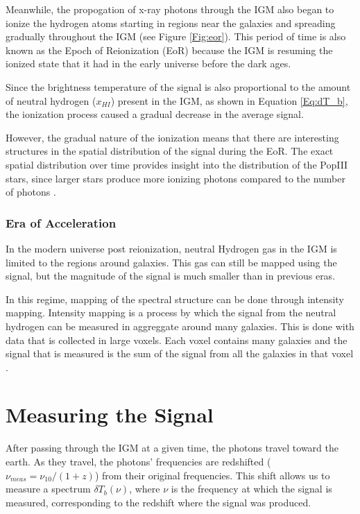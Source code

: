 Meanwhile, the propogation of x-ray photons through the IGM also began to ionize the hydrogen atoms starting in regions near the galaxies and spreading gradually throughout the IGM (see Figure \ref{Fig:eor}). This period of time is also known as the Epoch of Reionization (EoR) because the IGM is resuming the ionized state that it had in the early universe before the dark ages. 

Since the brightness temperature of the \cm signal is also proportional to the amount of neutral hydrogen ($x_{HI}$) present in the IGM, as shown in Equation \ref{Eq:dT_b}, the ionization process caused a gradual decrease in the average \cm signal. 

However, the gradual nature of the ionization means that there are interesting structures in the spatial distribution of the \cm signal during the EoR. The exact spatial distribution over time provides insight into the distribution of the PopIII stars, since larger stars produce more ionizing photons compared to the number of \lya  photons \cite{furlanetto_2006}. 

\subsubsection{Era of Acceleration}
In the modern universe post reionization, neutral Hydrogen gas in the IGM is limited to the regions around galaxies. This gas can still be mapped using the \cm signal, but the magnitude of the signal is much smaller than in previous eras. 

In this regime, mapping of the spectral structure can be done through intensity mapping. Intensity mapping is a process by which the signal from the neutral hydrogen can be measured in aggreggate around many galaxies. This is done with data that is collected in large voxels. Each voxel contains many galaxies and the \cm signal that is measured is the sum of the \cm signal from all the galaxies in that voxel \cite{masui_2012}.

\section{Measuring the \cm Signal}
After passing through the IGM at a given time, the \cm photons travel toward the earth. As they travel, the photons' frequencies are redshifted ($\nu_{meas} = \nu_{10}/(1+z)$) from their original frequencies. This shift allows us to measure a spectrum $\delta T_b (\nu)$, where $\nu$ is the frequency at which the signal is measured, corresponding to the redshift where the signal was produced. 

